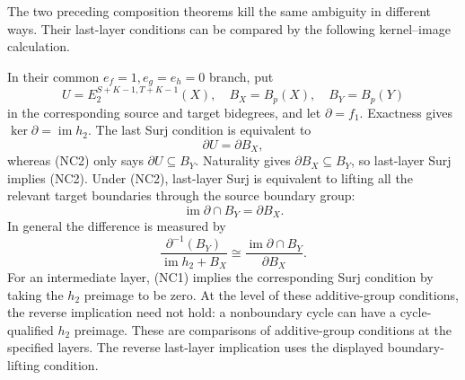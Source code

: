 \begin{proposition}
\label{sem:ProofTools:ml-last-layer}
The two preceding composition theorems kill the same ambiguity in
different ways. Their last-layer conditions can be compared by the
following kernel--image calculation.\par
In their common $e_f=1,e_g=e_h=0$ branch, put
\[
 U=E_2^{S+K-1,T+K-1}(X),\quad B_X=B_p(X),\quad B_Y=B_p(Y)
\]
in the corresponding source and target bidegrees, and let $\partial=f_1$.
Exactness gives $\ker\partial=\operatorname{im}h_2$.
The last Surj condition is equivalent to
\[
 \partial U=\partial B_X,
\]
whereas (NC2) only says $\partial U\subseteq B_Y$.
Naturality gives $\partial B_X\subseteq B_Y$, so last-layer Surj implies
(NC2). Under (NC2), last-layer Surj is equivalent to lifting all the
relevant target boundaries through the source boundary group:
\[
 \operatorname{im}\partial\cap B_Y=\partial B_X.
\]
In general the difference is measured by
\[
 \frac{\partial^{-1}(B_Y)}{\operatorname{im}h_2+B_X}
 \cong\frac{\operatorname{im}\partial\cap B_Y}{\partial B_X}.
\]
For an intermediate layer, (NC1) implies the corresponding Surj
condition by taking the $h_2$ preimage to be zero. At the level of these
additive-group conditions, the reverse implication need not hold: a
nonboundary cycle can have a cycle-qualified $h_2$ preimage. These are comparisons of additive-group conditions at the specified layers.
The reverse last-layer implication uses the displayed boundary-lifting condition.
\end{proposition}
